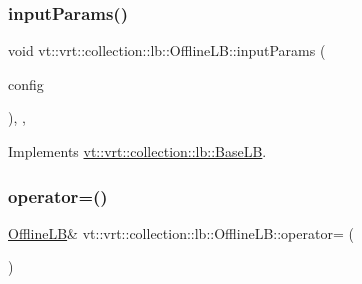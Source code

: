 \mbox{\label{structvt_1_1vrt_1_1collection_1_1lb_1_1_offline_l_b_a00fdf3796bc26affb03f45f5570560b6}} 
\subsubsection{\texorpdfstring{input\+Params()}{inputParams()}}
{\footnotesize\ttfamily void vt\+::vrt\+::collection\+::lb\+::\+Offline\+L\+B\+::input\+Params (\begin{DoxyParamCaption}\item[{\hyperlink{structvt_1_1vrt_1_1collection_1_1balance_1_1_config_entry}{balance\+::\+Config\+Entry} $\ast$}]{config }\end{DoxyParamCaption})\hspace{0.3cm}{\ttfamily [inline]}, {\ttfamily [override]}, {\ttfamily [virtual]}}



Implements \hyperlink{structvt_1_1vrt_1_1collection_1_1lb_1_1_base_l_b_acf56a0cc29f5e00c0dccf2003baa2f43}{vt\+::vrt\+::collection\+::lb\+::\+Base\+LB}.

\mbox{\label{structvt_1_1vrt_1_1collection_1_1lb_1_1_offline_l_b_a94affec36f4542b31b67748b17f577bb}} 
\subsubsection{\texorpdfstring{operator=()}{operator=()}\hspace{0.1cm}{\footnotesize\ttfamily [1/2]}}
{\footnotesize\ttfamily \hyperlink{structvt_1_1vrt_1_1collection_1_1lb_1_1_offline_l_b}{Offline\+LB}\& vt\+::vrt\+::collection\+::lb\+::\+Offline\+L\+B\+::operator= (\begin{DoxyParamCaption}\item[{\hyperlink{structvt_1_1vrt_1_1collection_1_1lb_1_1_offline_l_b}{Offline\+LB} const \&}]{ }\end{DoxyParamCaption})\hspace{0.3cm}{\ttfamily [delete]}}


